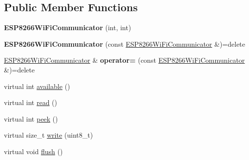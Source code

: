\subsection*{Public Member Functions}
\begin{DoxyCompactItemize}
\item 
\mbox{\label{classwood_box_1_1communication_1_1wifi_1_1_e_s_p8266_wi_fi_communicator_a0af11f50c19c8d00112e61e7919294ef}} 
{\bfseries E\+S\+P8266\+Wi\+Fi\+Communicator} (int, int)
\item 
\mbox{\label{classwood_box_1_1communication_1_1wifi_1_1_e_s_p8266_wi_fi_communicator_a7e7137815f9b6d8dc18adcef1ccb13cc}} 
{\bfseries E\+S\+P8266\+Wi\+Fi\+Communicator} (const \mbox{\hyperlink{classwood_box_1_1communication_1_1wifi_1_1_e_s_p8266_wi_fi_communicator}{E\+S\+P8266\+Wi\+Fi\+Communicator}} \&)=delete
\item 
\mbox{\label{classwood_box_1_1communication_1_1wifi_1_1_e_s_p8266_wi_fi_communicator_a422e4ef0462beca6e66a5909b41966ef}} 
\mbox{\hyperlink{classwood_box_1_1communication_1_1wifi_1_1_e_s_p8266_wi_fi_communicator}{E\+S\+P8266\+Wi\+Fi\+Communicator}} \& {\bfseries operator=} (const \mbox{\hyperlink{classwood_box_1_1communication_1_1wifi_1_1_e_s_p8266_wi_fi_communicator}{E\+S\+P8266\+Wi\+Fi\+Communicator}} \&)=delete
\item 
virtual int \mbox{\hyperlink{classwood_box_1_1communication_1_1wifi_1_1_e_s_p8266_wi_fi_communicator_aa73f46aaaf5441b79dd4a15be293aeb4}{available}} ()
\item 
virtual int \mbox{\hyperlink{classwood_box_1_1communication_1_1wifi_1_1_e_s_p8266_wi_fi_communicator_a3bd1c8f72256e92c6dbdab9272fd3543}{read}} ()
\item 
virtual int \mbox{\hyperlink{classwood_box_1_1communication_1_1wifi_1_1_e_s_p8266_wi_fi_communicator_accc6832fa7351cb977b9e3a805dc8107}{peek}} ()
\item 
virtual size\+\_\+t \mbox{\hyperlink{classwood_box_1_1communication_1_1wifi_1_1_e_s_p8266_wi_fi_communicator_a6bb904e5302da7ec3fefc6e9a896f5f8}{write}} (uint8\+\_\+t)
\item 
virtual void \mbox{\hyperlink{classwood_box_1_1communication_1_1wifi_1_1_e_s_p8266_wi_fi_communicator_a523aec958ef48fa917621a560d964f40}{flush}} ()

\end{DoxyCompactItemize}
